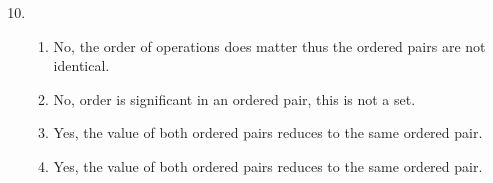 \documentclass[12pt]{article}
\begin{document}
\begin{enumerate}
\setcounter{enumi}{9}
\item %
  \begin{enumerate}
  \item No, the order of operations does matter thus the ordered pairs are not identical.
  \item No, order is significant in an ordered pair, this is not a set.
  \item Yes, the value of both ordered pairs reduces to the same ordered pair.
  \item Yes, the value of both ordered pairs reduces to the same ordered pair.
  \end{enumerate}
\end{enumerate}
\end{document}
